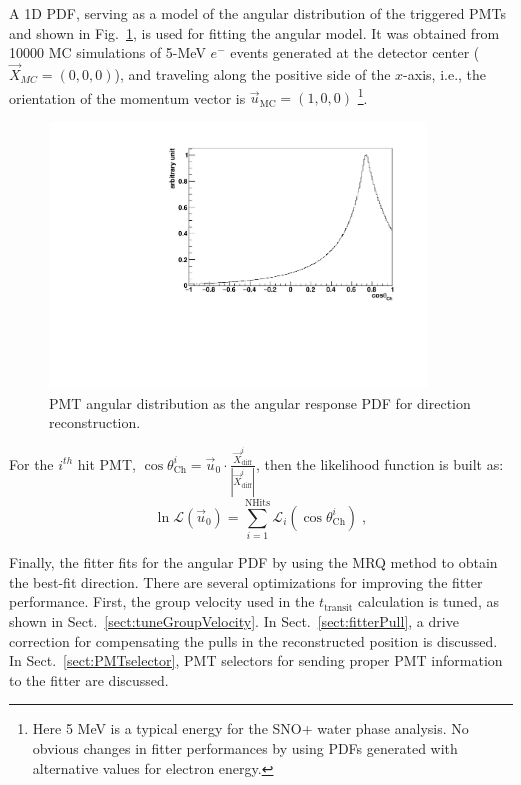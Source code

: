 A 1D PDF, serving as a model of the angular distribution of the triggered PMTs and shown in Fig.~\ref{fig:MPW_angularPDF}, is used for fitting the angular model. It was obtained from 10000 MC simulations of 5-MeV $e^-$ events generated at the detector center ($\vec{X}_{MC}=(0,0,0)$), and traveling along the positive side of the $x$-axis, i.e., the orientation of the momentum vector is $\vec{u}_{\mathrm{MC}}=(1,0,0)$ \footnote{Here 5 MeV is a typical energy for the SNO+ water phase analysis. No obvious changes in fitter performances by using PDFs generated with alternative values for electron energy.}.

\begin{figure}[!htb]
	\centering
	\includegraphics[width=10cm]{MPW_angularPDF.pdf}
	\caption{PMT angular distribution as the angular response PDF for direction reconstruction.}
	\label{fig:MPW_angularPDF}
\end{figure}

For the $i^{th}$ hit PMT, $\cos\theta^i_{\mathrm{Ch}}=\vec{u}_0\cdot\frac{\vec{X}^i_{{\mathrm{diff}}}}{|\vec{X}^i_{{\mathrm{diff}}}|}$, then the likelihood function is built as:
\begin{equation}
\ln \mathcal{L}(\vec{u}_0)=\sum_{i=1}^{{\mathrm{NHits}}}\mathcal{L}_i(\cos\theta_{\mathrm{Ch}}^i)\;,
\end{equation}

Finally, the fitter fits for the angular PDF by using the MRQ method to obtain the best-fit direction. There are several optimizations for improving the fitter performance. First, the group velocity used in the $t_{\mathrm{transit}}$ calculation is tuned, as shown in Sect.~\ref{sect:tuneGroupVelocity}. In Sect.~\ref{sect:fitterPull}, a drive correction for compensating the pulls in the reconstructed position is discussed. In Sect.~\ref{sect:PMTselector}, PMT selectors for sending proper PMT information to the fitter are discussed. 

